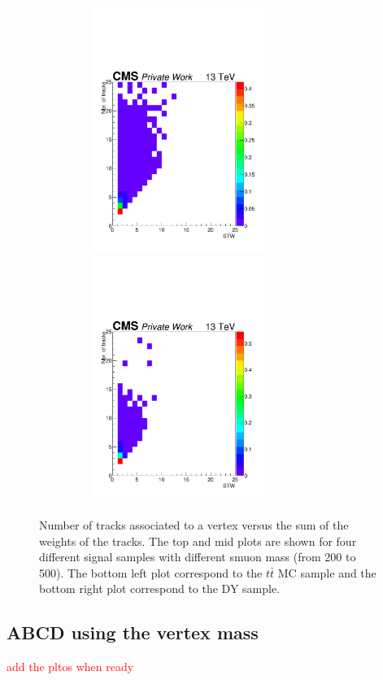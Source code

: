 \documentclass{cernatlasnote}
\begin{document}
\begin{figure}[ht]
\includegraphics[height=8cm, width=9cm, trim= 0cm 0cm 0cm 0cm,clip]{images/VTXBDT/STW_Ntrks_TTTo2L2Nu.pdf}\includegraphics[height=8cm, width=9cm, trim= 0cm 0cm 0cm 0cm,clip]{images/VTXBDT/STW_Ntrks_DYM50.pdf}
\caption{\label{fig:STWvsNtrks} Number of tracks associated to a vertex versus the sum of the weights of the tracks. The top and mid plots are shown for four different signal samples with different smuon mass (from 200 to 500). The bottom left plot correspond to the $t\bar{t}$ MC sample and the bottom right plot correspond to the DY sample.}
\end{figure} 
\FloatBarrier


\subsection{ABCD using the vertex mass}
\label{APP:ABCDVTXMASS}
\textcolor{red}{add the pltos when ready}
\end{document}
